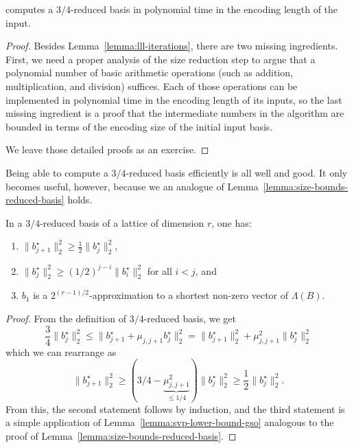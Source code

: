 \begin{theorem}
   computes a $3/4$-reduced basis in polynomial time
  in the encoding length of the input.
\end{theorem}
\begin{proof}
  Besides Lemma~\ref{lemma:lll-iterations},
  there are two missing ingredients.
  First, we need a proper analysis of the size reduction step to argue
  that a polynomial number of basic arithmetic operations (such as addition, multiplication, and division) suffices.
  Each of those operations can be implemented in polynomial time in the encoding length of its inputs,
  so the last missing ingredient is a proof that the intermediate numbers in the algorithm
  are bounded in terms of the encoding size of the initial input basis.

  We leave those detailed proofs as an exercise.
\end{proof}

Being able to compute a $3/4$-reduced basis efficiently is all well and good.
It only becomes useful, however, because we an analogue of Lemma~\ref{lemma:size-bounds-reduced-basis} holds.

\begin{lemma}
  \label{lemma:lll-reduced-properties}
  In a $3/4$-reduced basis of a lattice of dimension $r$, one has:
  \begin{enumerate}
    \item $\| b_{j+1}^\star \|_2^2 \geq \frac{1}{2} \|b_j^\star\|_2^2$,
    \item $\| b_j^\star \|_2^2 \geq (1/2)^{j-i} \|b_i^\star\|_2^2$ for all $i < j$, and
    \item $b_1$ is a $2^{(r-1)/2}$-approximation to a shortest non-zero vector of $\Lambda(B)$.
  \end{enumerate}
\end{lemma}
\begin{proof}
  From the definition of $3/4$-reduced basis, we get
  \[
    \frac{3}{4} \|b_j^\star \|_2^2 \leq \| b_{j+1}^\star + \mu_{j,j+1} b_j^\star \|_2^2
      = \| b_{j+1}^\star \|_2^2 + \mu_{j,j+1}^2 \|b_j^\star\|_2^2
  \]
  which we can rearrange as
  \[
    \| b_{j+1}^\star \|_2^2 \geq (3/4 - \underbrace{\mu_{j,j+1}^2}_{\leq 1/4}) \|b_j^\star\|_2^2 \geq \frac{1}{2} \|b_j^\star\|_2^2.
  \]
  From this, the second statement follows by induction,
  and the third statement is a simple application of
  Lemma~\ref{lemma:svp-lower-bound-gso} analogous to the proof of Lemma~\ref{lemma:size-bounds-reduced-basis}.
\end{proof}







